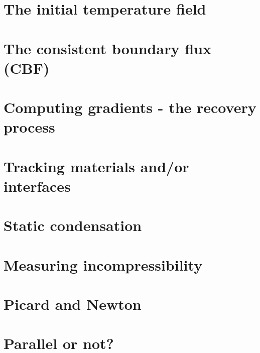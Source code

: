 \section{The initial temperature field}  %
\newpage %
\section{The consistent boundary flux (CBF) \label{ss:cbf}}  %
\newpage %
\section{Computing gradients - the recovery process \label{ss:gradrecovery}}  %
\newpage %
\section{Tracking materials and/or interfaces}  %
\newpage %
\section{Static condensation}  %
\newpage %
\section{Measuring incompressibility \label{ss_incomp}}  %
\newpage %
\section{Picard and Newton \label{ss_nonlinear}}  %
\newpage %
\section{Parallel or not?} \label{sec:parallel}  %
\newpage %
